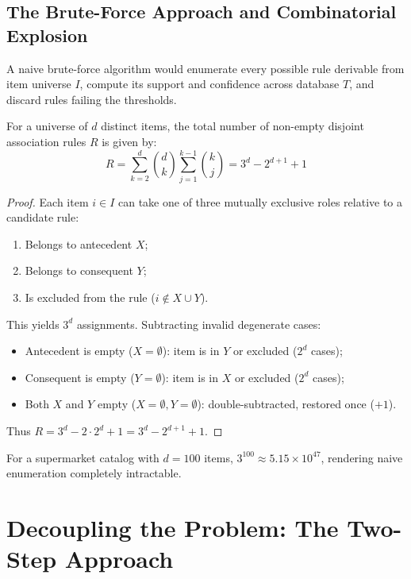 \subsection{The Brute-Force Approach and Combinatorial Explosion}
A naive brute-force algorithm would enumerate every possible rule derivable from item universe $I$, compute its support and confidence across database $T$, and discard rules failing the thresholds.

For a universe of $d$ distinct items, the total number of non-empty disjoint association rules $R$ is given by:
\begin{equation}
\label{eq:dm-brute-force-rules-count-en}
R = \sum_{k=2}^d \binom{d}{k} \sum_{j=1}^{k-1} \binom{k}{j} = 3^d - 2^{d+1} + 1
\end{equation}

\begin{proof}
Each item $i \in I$ can take one of three mutually exclusive roles relative to a candidate rule:
\begin{enumerate}[noitemsep]
    \item Belongs to antecedent $X$;
    \item Belongs to consequent $Y$;
    \item Is excluded from the rule ($i \notin X \cup Y$).
\end{enumerate}
This yields $3^d$ assignments. Subtracting invalid degenerate cases:
\begin{itemize}[noitemsep]
    \item Antecedent is empty ($X = \emptyset$): item is in $Y$ or excluded ($2^d$ cases);
    \item Consequent is empty ($Y = \emptyset$): item is in $X$ or excluded ($2^d$ cases);
    \item Both $X$ and $Y$ empty ($X = \emptyset, Y = \emptyset$): double-subtracted, restored once ($+1$).
\end{itemize}
Thus $R = 3^d - 2 \cdot 2^d + 1 = 3^d - 2^{d+1} + 1$.
\end{proof}

For a supermarket catalog with $d = 100$ items, $3^{100} \approx 5.15 \times 10^{47}$, rendering naive enumeration completely intractable.

\section{Decoupling the Problem: The Two-Step Approach}
\label{sec:dm-two-step-approach}


